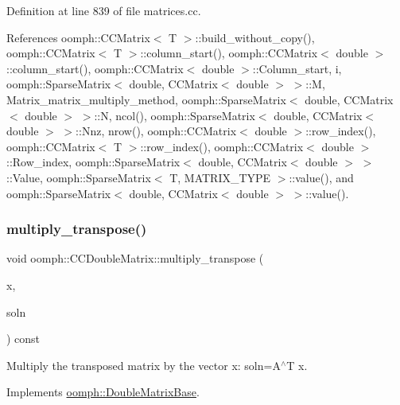 Definition at line 839 of file matrices.\+cc.



References oomph\+::\+C\+C\+Matrix$<$ T $>$\+::build\+\_\+without\+\_\+copy(), oomph\+::\+C\+C\+Matrix$<$ T $>$\+::column\+\_\+start(), oomph\+::\+C\+C\+Matrix$<$ double $>$\+::column\+\_\+start(), oomph\+::\+C\+C\+Matrix$<$ double $>$\+::\+Column\+\_\+start, i, oomph\+::\+Sparse\+Matrix$<$ double, C\+C\+Matrix$<$ double $>$ $>$\+::M, Matrix\+\_\+matrix\+\_\+multiply\+\_\+method, oomph\+::\+Sparse\+Matrix$<$ double, C\+C\+Matrix$<$ double $>$ $>$\+::N, ncol(), oomph\+::\+Sparse\+Matrix$<$ double, C\+C\+Matrix$<$ double $>$ $>$\+::\+Nnz, nrow(), oomph\+::\+C\+C\+Matrix$<$ double $>$\+::row\+\_\+index(), oomph\+::\+C\+C\+Matrix$<$ T $>$\+::row\+\_\+index(), oomph\+::\+C\+C\+Matrix$<$ double $>$\+::\+Row\+\_\+index, oomph\+::\+Sparse\+Matrix$<$ double, C\+C\+Matrix$<$ double $>$ $>$\+::\+Value, oomph\+::\+Sparse\+Matrix$<$ T, M\+A\+T\+R\+I\+X\+\_\+\+T\+Y\+P\+E $>$\+::value(), and oomph\+::\+Sparse\+Matrix$<$ double, C\+C\+Matrix$<$ double $>$ $>$\+::value().

\mbox{\label{classoomph_1_1CCDoubleMatrix_a582352912b0a7e097f9ac31c5054beed}} 
\subsubsection{\texorpdfstring{multiply\+\_\+transpose()}{multiply\_transpose()}}
{\footnotesize\ttfamily void oomph\+::\+C\+C\+Double\+Matrix\+::multiply\+\_\+transpose (\begin{DoxyParamCaption}\item[{const \hyperlink{classoomph_1_1DoubleVector}{Double\+Vector} \&}]{x,  }\item[{\hyperlink{classoomph_1_1DoubleVector}{Double\+Vector} \&}]{soln }\end{DoxyParamCaption}) const\hspace{0.3cm}{\ttfamily [virtual]}}



Multiply the transposed matrix by the vector x\+: soln=A$^\wedge$T x. 



Implements \hyperlink{classoomph_1_1DoubleMatrixBase_a843d44405b70da1d96b43218a21e6ffc}{oomph\+::\+Double\+Matrix\+Base}.



